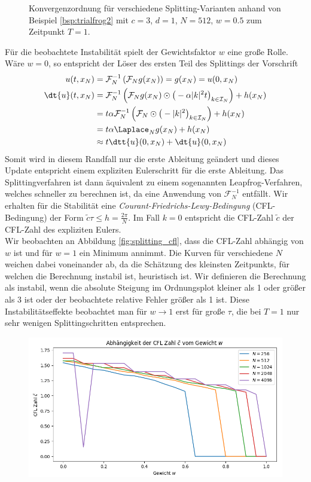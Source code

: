 \begin{mathbsp}
\begin{figure}[!htb]
\caption{Konvergenzordnung für verschiedene Splitting-Varianten anhand von Beispiel \ref{bsp:trialfrog2} mit $c=3$, $d=1$, $N=512$, $w=0.5$ zum Zeitpunkt $T=1$.}
\label{fig:splitting_convergence}
\end{figure}
Für die beobachtete Instabilität spielt der Gewichtsfaktor $w$ eine große Rolle. Wäre $w=0$, so entspricht der Löser des ersten Teil des Splittings der Vorschrift
\begin{align*}
u(t,x_N)&=\mathcal{F}_N^{-1}\left(\mathcal{F}_Ng(x_N)\right)=g(x_N)=u(0,x_N)\\
\dt{u}(t,x_N)&=\mathcal{F}_N^{-1}\left(\mathcal{F}_Ng(x_N)\odot \big(-\alpha |k|^2t\big)_{k\in\mathcal{I}_N}\right)+h(x_N)\\
&=t \alpha \mathcal{F}_N^{-1}\left(\mathcal{F}_N\odot \big(-|k|^2\big)_{k\in\mathcal{I}_N}\right)+h(x_N)\\
&=t\alpha \Laplace_N g(x_N)+h(x_N)\\
&\approx t\dtt{u}(0,x_N)+\dt{u}(0,x_N)
\end{align*}
Somit wird in diesem Randfall nur die erste Ableitung geändert und dieses Update entspricht einem expliziten Eulerschritt für die erste Ableitung. Das Splittingverfahren ist dann äquivalent zu einem sogenannten Leapfrog-Verfahren, welches schneller zu berechnen ist, da eine Anwendung von $\mathcal{F}_N^{-1}$ entfällt. Wir erhalten für die Stabilität eine \emph{Courant-Friedrichs-Lewy-Bedingung} (CFL-Bedingung) der Form $\tilde{c}\tau\le h=\frac{2\pi}{N}$. Im Fall $k=0$ entspricht die CFL-Zahl $\tilde{c}$ der CFL-Zahl des expliziten Eulers.\\[0.3cm]
Wir beobachten an Abbildung \ref{fig:splitting_cfl}, dass die CFL-Zahl abhängig von $w$ ist und für $w=1$ ein Minimum annimmt. Die Kurven für verschiedene $N$ weichen dabei voneinander ab, da die Schätzung des kleinsten Zeitpunkts, für welchen die Berechnung instabil ist, heuristisch ist. Wir definieren die Berechnung als instabil, wenn die absolute Steigung im Ordnungsplot kleiner als 1 oder größer als 3 ist oder der beobachtete relative Fehler größer als 1 ist. Diese Instabilitätseffekte beobachtet man für $w\to 1$ erst für große $\tau$, die bei $T=1$ nur sehr wenigen Splittingschritten entsprechen.
\begin{figure}[!htb]
\includegraphics[width=\textwidth]{Figures/cfl_estimations_frog2.png}

\end{figure}
\end{mathbsp}
